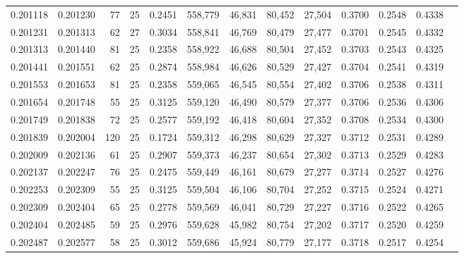 \begin{tabular}{rrrrrrrrrrrrr}
0.201118 & 0.201230 &    77 &  25 &                                     0.2451 & 558,779 &  46,831 &  80,452 &  27,504 & 0.3700 & 0.2548 & 0.4338 \\
0.201231 & 0.201313 &    62 &  27 &                                     0.3034 & 558,841 &  46,769 &  80,479 &  27,477 & 0.3701 & 0.2545 & 0.4332 \\
0.201313 & 0.201440 &    81 &  25 &                                     0.2358 & 558,922 &  46,688 &  80,504 &  27,452 & 0.3703 & 0.2543 & 0.4325 \\
0.201441 & 0.201551 &    62 &  25 &                                     0.2874 & 558,984 &  46,626 &  80,529 &  27,427 & 0.3704 & 0.2541 & 0.4319 \\
0.201553 & 0.201653 &    81 &  25 &                                     0.2358 & 559,065 &  46,545 &  80,554 &  27,402 & 0.3706 & 0.2538 & 0.4311 \\
0.201654 & 0.201748 &    55 &  25 &                                     0.3125 & 559,120 &  46,490 &  80,579 &  27,377 & 0.3706 & 0.2536 & 0.4306 \\
0.201749 & 0.201838 &    72 &  25 &                                     0.2577 & 559,192 &  46,418 &  80,604 &  27,352 & 0.3708 & 0.2534 & 0.4300 \\
0.201839 & 0.202004 &   120 &  25 &                                     0.1724 & 559,312 &  46,298 &  80,629 &  27,327 & 0.3712 & 0.2531 & 0.4289 \\
0.202009 & 0.202136 &    61 &  25 &                                     0.2907 & 559,373 &  46,237 &  80,654 &  27,302 & 0.3713 & 0.2529 & 0.4283 \\
0.202137 & 0.202247 &    76 &  25 &                                     0.2475 & 559,449 &  46,161 &  80,679 &  27,277 & 0.3714 & 0.2527 & 0.4276 \\
0.202253 & 0.202309 &    55 &  25 &                                     0.3125 & 559,504 &  46,106 &  80,704 &  27,252 & 0.3715 & 0.2524 & 0.4271 \\
0.202309 & 0.202404 &    65 &  25 &                                     0.2778 & 559,569 &  46,041 &  80,729 &  27,227 & 0.3716 & 0.2522 & 0.4265 \\
0.202404 & 0.202485 &    59 &  25 &                                     0.2976 & 559,628 &  45,982 &  80,754 &  27,202 & 0.3717 & 0.2520 & 0.4259 \\
0.202487 & 0.202577 &    58 &  25 &                                     0.3012 & 559,686 &  45,924 &  80,779 &  27,177 & 0.3718 & 0.2517 & 0.4254 \\

\end{tabular}
